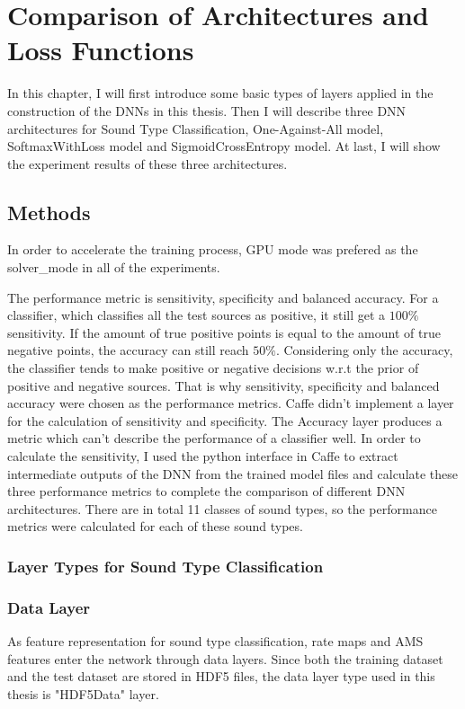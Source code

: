 \chapter{Comparison of Architectures and Loss Functions}
\label{chap:architecture}
In this chapter, I will first introduce some basic types of layers applied in the construction of the DNNs in this thesis. Then I will describe three DNN architectures for Sound Type Classification,  One-Against-All model, SoftmaxWithLoss model and SigmoidCrossEntropy model. At last, I will show the experiment results of these three architectures.

\section{Methods}
In order to accelerate the training process, GPU mode was prefered as the solver\_mode in all of the experiments. 

The performance metric is sensitivity, specificity and balanced accuracy. %
For a classifier, which classifies all the test sources as positive, it still get a $100\%$ sensitivity. If the amount of true positive points is equal to the amount of true negative points, the accuracy can still reach $50\%$. Considering only the accuracy, the classifier tends to make positive or negative decisions w.r.t the prior of positive and negative sources. That is why  sensitivity, specificity and balanced accuracy were chosen as the performance metrics. Caffe didn't implement a layer for the calculation of sensitivity and specificity. The Accuracy layer produces a metric which can't describe the performance of a classifier well. In order to calculate the sensitivity, I used the python interface in Caffe to extract intermediate outputs of the DNN from the trained model files and calculate these three performance metrics to complete the comparison of different DNN architectures. There are in total 11 classes of sound types, so the performance metrics were calculated for each of these sound types. 

\subsection{Layer Types for Sound Type Classification}
\subsection{Data Layer}
As feature representation for sound type classification, rate maps and AMS features enter the network through data layers. Since both the training dataset and the test dataset are stored in HDF5 files, the data layer type used in this thesis is "HDF5Data" layer.
